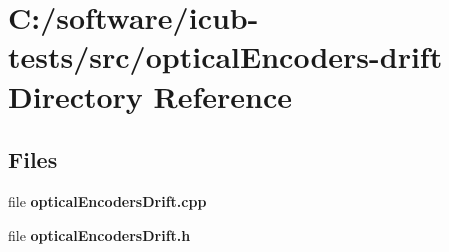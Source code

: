 \section{C\+:/software/icub-\/tests/src/optical\+Encoders-\/drift Directory Reference}
\label{dir_7f61241abd7fbdf9954805296c6d0bed}
\subsection*{Files}
\begin{DoxyCompactItemize}
\item 
file {\bfseries optical\+Encoders\+Drift.\+cpp}
\item 
file {\bfseries optical\+Encoders\+Drift.\+h}
\end{DoxyCompactItemize}
